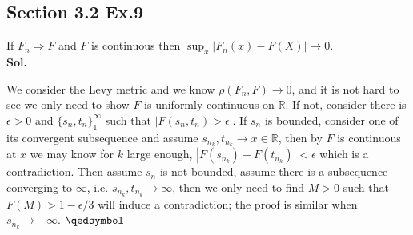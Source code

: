 \documentclass[lang=en,11pt,a4paper,citestyle =authoryear]{elegantpaper}
\newcommand{\prvd}{$\hfill \qedsymbol$}
\newcommand{\R}{\mathbb{R}}
\begin{document}
\subsection*{Section 3.2 Ex.9} 
If $F_n\Rightarrow F$ and $F$ is continuous then $\sup_x|F_n(x)-F(X)|\to 0$.
\vspace{0.5em}\\
\textbf{Sol.} \par
We consider the Levy metric and we know $\rho(F_n,F)\to 0$, and it is not hard to see we only need to show $F$ is uniformly continuous on $\R$. If not, consider there is $\epsilon>0$ and $\{s_n,t_n\}_1^{\infty}$ such that $|F(s_n,t_n) > \epsilon|$. If $s_n$ is bounded, consider one of its convergent subsequence and assume $s_{n_k},t_{n_k} \to x \in \R$, then by $F$ is continuous at $x$ we may know for $k$ large enough, $|F(s_{n_k})-F(t_{n_k})|<\epsilon$ which is a contradiction. Then assume $s_n$ is not bounded, assume there is a subsequence converging to $\infty$, i.e. $s_{n_k},t_{n_k} \to \infty$, then we only need to find $M>0$ such that $F(M)>1-\epsilon/3$ will induce a contradiction; the proof is similar when $s_{n_k}\to -\infty$.
\prvd
\vspace{0.5em}

\addappheadtotoc
\end{document}
